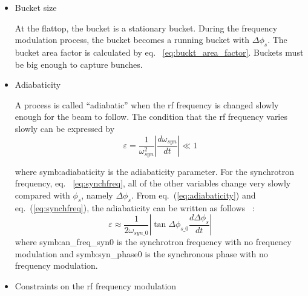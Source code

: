\begin{itemize}
\item Bucket size

At the flattop, the bucket is a stationary bucket. During the frequency modulation process, the bucket becomes a running bucket with $\Delta\phi_s$. The bucket area factor is calculated by eq. ~\ref{eq:buckt_area_factor}. Buckets must be big enough to capture bunches.

\item Adiabaticity 


A process is called “adiabatic” when the rf frequency is changed slowly enough for the beam to follow. The condition that the rf frequency varies slowly can be expressed by 
\begin{equation}
\varepsilon=\frac{1}{\omega_\mathit{syn}^2}|\frac{d\omega_\mathit{syn}}{dt}| \ll 1
\label{eq:adiabaticity}
\end{equation} 

where \gls{symb:adiabaticity} is the adiabaticity parameter. For the synchrotron frequency, eq. ~\ref{eq:synchfreq}, all of the other variables change very slowly compared with $\phi_s$,  namely $\Delta \phi_s$. From eq.~(\ref{eq:adiabaticity}) and eq.~(\ref{eq:synchfreq}), the adiabaticity can be written as follows ~\cite{ezura_beam-dynamics_2008}:
\begin{equation}
\varepsilon \approx \frac{1}{2\omega_{\mathit{syn\_0}}}|\tan\Delta \phi_{\mathit{s\_0}}\frac{d\Delta \phi_s}{dt}|
\label{eq:derivation}
\end{equation} 
where \gls{symb:an_freq_syn0} is the synchrotron frequency with no frequency modulation and \gls{symb:syn_phase0} is the synchronous phase with no frequency modulation.
\item Constraints on the rf frequency modulation


\end{itemize}
